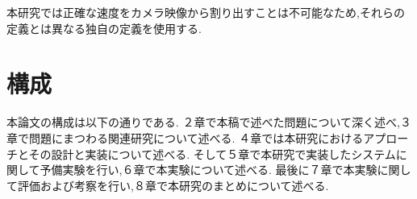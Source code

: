 本研究では正確な速度をカメラ映像から割り出すことは不可能なため,それらの定義とは異なる独自の定義を使用する.


\section{構成}
本論文の構成は以下の通りである.
２章で本稿で述べた問題について深く述べ,３章で問題にまつわる関連研究について述べる.
４章では本研究におけるアプローチとその設計と実装について述べる.
そして５章で本研究で実装したシステムに関して予備実験を行い,６章で本実験について述べる.
最後に７章で本実験に関して評価および考察を行い,８章で本研究のまとめについて述べる.